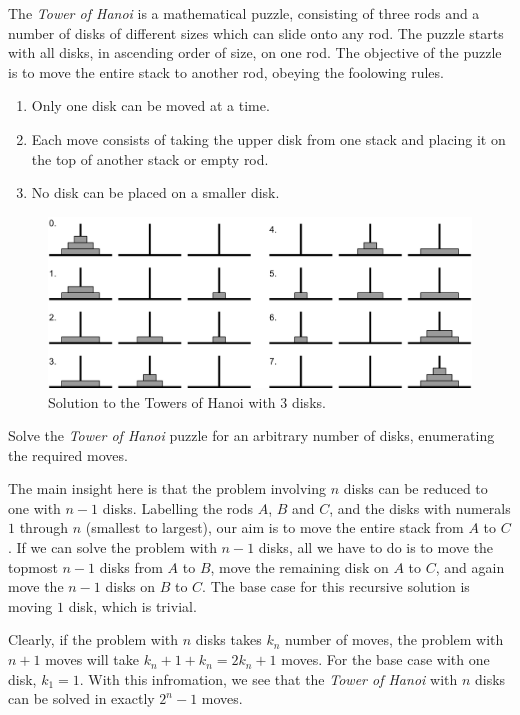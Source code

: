 

\problem The \textit{Tower of Hanoi} is a mathematical puzzle, consisting of three rods and a number of disks of different sizes which
can slide onto any rod. The puzzle starts with all disks, in ascending order of size, on one rod. The objective of the puzzle is to
move the entire stack to another rod, obeying the foolowing rules.
\begin{enumerate}
	\item Only one disk can be moved at a time.
	\item Each move consists of taking the upper disk from one stack and placing it on the top of another stack or empty rod.
	\item No disk can be placed on a smaller disk.
\end{enumerate}
\begin{figure}[h]
	\begin{center}
		\includegraphics[scale=0.7]{hanoi.png}
	\end{center}
	\caption*{Solution to the Towers of Hanoi with 3 disks.}
	\label{fig:hanoi_solved}
\end{figure}

Solve the \textit{Tower of Hanoi} puzzle for an arbitrary number of disks, enumerating the required moves.

\solution The main insight here is that the problem involving $n$ disks can be reduced to one with $n - 1$ disks.
Labelling the rods $A$, $B$ and $C$, and the disks with numerals $1$ through $n$ (smallest to largest), our aim is to move the
entire stack from $A$ to $C$. If we can solve the problem with $n - 1$ disks, all we have to do is to move the topmost $n - 1$ disks
from $A$ to $B$, move the remaining disk on $A$ to $C$, and again move the $n - 1$ disks on $B$ to $C$. The base case for this
recursive solution is moving $1$ disk, which is trivial.

Clearly, if the problem with $n$ disks takes $k_n$ number of moves, the problem with $n + 1$ moves will take $k_n + 1 + k_n = 2k_n + 1$ moves.
For the base case with one disk, $k_1 = 1$. With this infromation, we see that the \textit{Tower of Hanoi} with $n$ disks can be solved
in exactly $2^n - 1$ moves.


